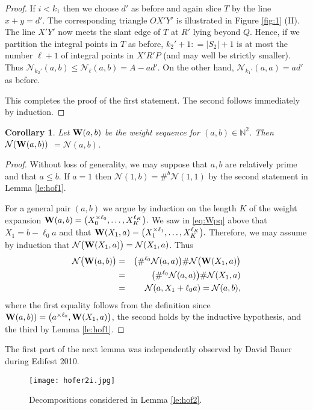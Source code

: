\documentclass[11pt]{amsart}
\newcommand{\labell}[1] {\label{#1}}
\newcommand{\1}{{{\mathchoice {\rm 1\mskip-4mu l} {\rm 1\mskip-4mu l}
{\rm 1\mskip-4.5mu l} {\rm 1\mskip-5mu l}}}}
\newcommand{\bW} {{\bf W}}
\newcommand{\N}{{\mathbb N}}
\newcommand{\Nn}{{\mathcal N}}
\newtheorem{cor}[theorem]{Corollary}
\numberwithin{figure}{section}
\numberwithin{equation}{section}
\begin{document}
\begin{proof}
If $i<k_1$ then we choose $d'$ as before and again slice $T$ by the line $x+y=d'$.  The corresponding triangle $OX'Y'$ is illustrated in Figure \ref{fig:1} (II). The line $X'Y'$ now meets the slant edge of $T$ at $R'$ lying beyond $Q$.  
Hence, if we partition the integral points in $T$ as before, $k_2'+1: = |S_2|+1$ 
is at most the number $\ell+1$ of integral points in $X'R'P$ (and may well be strictly smaller).  Thus 
$\Nn_{k_2'}(a,b) \le \Nn_{\ell}(a,b) = A-ad'$. On the other hand, $\Nn_{k_1'}(a,a) = ad'$ as before.

This completes the proof of the first statement.  The second follows immediately by induction.
\end{proof}



\begin{cor}\labell{cor:1} 
Let $\bW(a,b)$ be the  weight sequence for $(a,b)\in \N^2$.  
Then $\Nn(\bW(a,b))$ $= \Nn(a,b)$. 
\end{cor}
\begin{proof} Without loss of generality, we may suppose that $a,b$ are relatively prime and that $a\le b$.   
If $a=1$ then $
\Nn(1,b) = \#^b \Nn(1,1)
$
by the second statement in Lemma \ref{le:hof1}.

For a general pair $(a,b)$ we argue by induction on the length $K$ of the weight expansion
 $\bW(a,b) = \bigl(X_0^{\times \ell_0},\dots,X_K^{\ell_K}\bigr).
 $
We saw in \eqref{eq:Wpq} above that  $X_1=b-\ell_0 a$ and that
 $\bW(X_1, a) = \bigl(X_1^{\times \ell_1},\dots,X_K^{\ell_K}\bigr).
 $  Therefore, we may assume by induction that 
 $\Nn\bigl(\bW(X_1,a)\bigr)= \Nn(X_1,a)$.  Thus
 \begin{eqnarray*}
 \Nn\bigl(\bW(a,b)\bigr) &=&  \bigl(\#^{\ell_0}\Nn(a,a)\bigr)
 \#\Nn\bigl(\bW(X_1,a)\bigr)\\
 &=&  \bigl(\#^{\ell_0}\Nn(a,a)\bigr)\#
 \Nn(X_1,a) \\
 &=&\Nn(a, X_1+\ell_0 a) = \Nn(a,b),
 \end{eqnarray*}
where the first equality follows from the definition since 
$\bW(a,b)) = \bigl(a^{\times \ell_0}, \bW(X_1,a)\bigr)$, 
the second holds by the inductive hypothesis, and the third by   
Lemma \ref{le:hof1}.
\end{proof}

  
  The first part of the next lemma was independently observed by  David Bauer during Edifest 2010.
  \begin{figure}[htbp] %
     \centering
     \texttt{[image: hofer2i.jpg]} 
     \caption{Decompositions considered in Lemma \ref{le:hof2}.}
     \label{fig:2}
  \end{figure}
  
\end{document}
